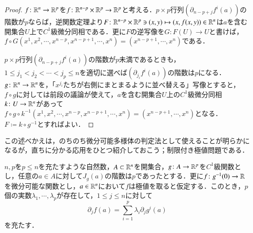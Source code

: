 \begin{proof}
$f \colon \mathbb{R}^n \to \mathbb{R}^p$を$f \colon \mathbb{R}^{n-p} \times \mathbb{R}^p \to \mathbb{R}^p$と考える．$p \times p$行列$(\partial_{n-p+j}f^i (a))$の階数が$p$ならば，逆関数定理より$F \colon \mathbb{R}^{n-p} \times \mathbb{R}^p \ni (x,y) \mapsto (x,f(x,y)) \in \mathbb{R}^n$は$a$を含む開集合$U$上で$C^1$級微分同相である．更に$F$の逆写像を$G \colon F(U) \to U$と書けば，$f\circ G(x^1,x^2, \cdots, x^{n-p}, x^{n-p+1}, \cdots, x^n) = (x^{n-p+1}, \cdots, x^n)$である．

$p \times p$行列$(\partial_{n-p+j}f^i (a))$の階数が$p$未満であるときも，$1 \leq j_1 < j_2 < \cdots < j_p \leq n$を適切に選べば$(\partial_{j_i} f^i(a))$の階数は$p$になる．$g \colon \mathbb{R}^n \to \mathbb{R}^n$を，「$x^{j_i}$たちが右側にまとまるように並べ替える」写像とすると，$f \circ g$に対しては前段の議論が使えて，$a$を含む開集合$U$上の$C^1$級微分同相$k \colon U \to \mathbb{R}^n$があって$f \circ g \circ k^{-1}(x^1,x^2, \cdots, x^{n-p}, x^{n-p+1}, \cdots, x^n) = (x^{n-p+1}, \cdots, x^n)$となる．$F \coloneqq k \circ g^{-1}$とすればよい．
\end{proof}

この述べかえは，のちのち微分可能多様体の判定法として使えることが明らかになるが，直ちに分かる応用をひとつ紹介しておこう；制限付き極値問題である．

\begin{prop}
$n,p$を$p \leq n$を充たすような自然数，$A \subset \mathbb{R}^n$を開集合，$g \colon A \to \mathbb{R}^p$を$C^1$級関数とし，任意の$a \in A$に対して$J_g(a)$の階数は$p$であったとする．更に$f \colon g^{-1}(0) \to \mathbb{R}$を微分可能な関数とし，$a \in \mathbb{R}^n$において$f$は極値を取ると仮定する．このとき，$p$個の実数$\lambda_1, \cdots, \lambda_p$が存在して，$1 \leq j \leq n$に対して
\begin{equation}
\partial_j f(a) = \sum_{i=1}^p \lambda_i \partial_j g^i(a)
\end{equation}を充たす．
\end{prop}

